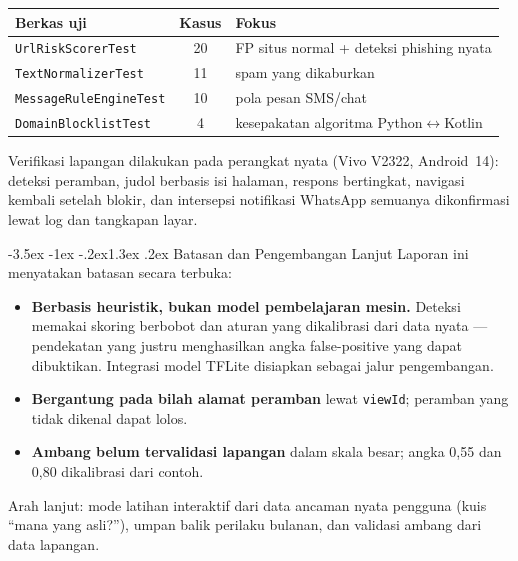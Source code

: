 \documentclass[11pt,a4paper]{article}
\makeatletter
\renewcommand\section{\@startsection{section}{1}{\z@}%
  {-3.5ex \@plus -1ex \@minus -.2ex}{1.3ex \@plus.2ex}%
  {\normalfont\Large\bfseries\color{navy}}}
\makeatother
\begin{document}
\begin{center}
\begin{tabularx}{\textwidth}{@{}l c X@{}}
  \toprule
  \textbf{Berkas uji} & \textbf{Kasus} & \textbf{Fokus} \\
  \midrule
  \texttt{UrlRiskScorerTest} & 20 & FP situs normal + deteksi phishing nyata \\
  \texttt{TextNormalizerTest} & 11 & spam yang dikaburkan \\
  \texttt{MessageRuleEngineTest} & 10 & pola pesan SMS/chat \\
  \texttt{DomainBlocklistTest} & 4 & kesepakatan algoritma Python$\leftrightarrow$Kotlin \\
  \bottomrule
\end{tabularx}
\end{center}

Verifikasi lapangan dilakukan pada perangkat nyata (Vivo V2322,
Android~14): deteksi peramban, judol berbasis isi halaman, respons
bertingkat, navigasi kembali setelah blokir, dan intersepsi notifikasi
WhatsApp semuanya dikonfirmasi lewat log dan tangkapan layar.

\section{Batasan dan Pengembangan Lanjut}
Laporan ini menyatakan batasan secara terbuka:
\begin{itemize}[leftmargin=1.4em,itemsep=3pt]
  \item \textbf{Berbasis heuristik, bukan model pembelajaran mesin.}
        Deteksi memakai skoring berbobot dan aturan yang dikalibrasi dari
        data nyata --- pendekatan yang justru menghasilkan angka
        false-positive yang dapat dibuktikan. Integrasi model TFLite
        disiapkan sebagai jalur pengembangan.
  \item \textbf{Bergantung pada bilah alamat peramban} lewat
        \texttt{viewId}; peramban yang tidak dikenal dapat lolos.
  \item \textbf{Ambang belum tervalidasi lapangan} dalam skala besar;
        angka 0{,}55 dan 0{,}80 dikalibrasi dari contoh.
\end{itemize}

Arah lanjut: mode latihan interaktif dari data ancaman nyata pengguna
(kuis ``mana yang asli?''), umpan balik perilaku bulanan, dan validasi
ambang dari data lapangan.
\end{document}
